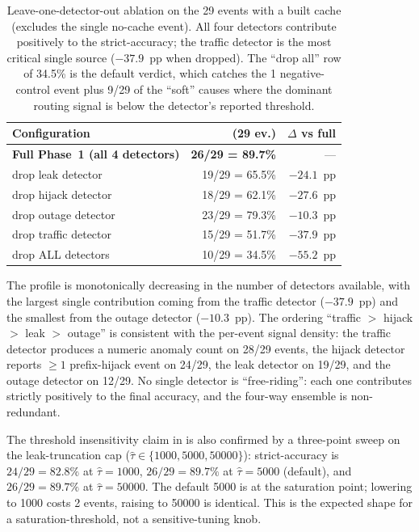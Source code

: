\begin{table}[h]
\centering
\small
\setlength{\tabcolsep}{4pt}
\begin{tabular}{p{}rr}
\hline
Configuration & \strict{} (29 ev.) & $\Delta$ vs full \\
\hline
\textbf{Full Phase~1 (all 4 detectors)} &
\textbf{26/29 = 89.7\%} & --- \\
\quad drop leak detector & 19/29 = 65.5\% & $-24.1$~pp \\
\quad drop hijack detector & 18/29 = 62.1\% & $-27.6$~pp \\
\quad drop outage detector & 23/29 = 79.3\% & $-10.3$~pp \\
\quad drop traffic detector & 15/29 = 51.7\% & $-37.9$~pp \\
\quad drop ALL detectors & 10/29 = 34.5\% & $-55.2$~pp \\
\hline
\end{tabular}

\caption{Leave-one-detector-out ablation on the 29
events with a built cache (excludes the single no-cache
event). All four detectors contribute positively to
the strict-accuracy; the traffic detector is the most
critical single source ($-37.9$~pp when dropped). The
\enquote{drop all} row of 34.5\% is the default
\protect verdict, which catches the 1
negative-control event plus 9/29 of the \enquote{soft}
causes where the dominant routing signal is below the
detector's reported threshold.}
\label{tab:detector-ablation}
\end{table}

The profile is monotonically decreasing in the number of
detectors available, with the largest single contribution
coming from the traffic detector ($-37.9$~pp) and the
smallest from the outage detector ($-10.3$~pp). The
ordering \enquote{traffic $>$ hijack $>$ leak $>$ outage}
is consistent with the per-event signal density:
the traffic detector produces a numeric anomaly count
on 28/29 events, the hijack detector reports
$\geq 1$ prefix-hijack event on 24/29, the leak detector
on 19/29, and the outage detector on 12/29. No single
detector is \enquote{free-riding}: each one contributes
strictly positively to the final accuracy, and the four-way
ensemble is non-redundant.

The threshold insensitivity claim in
 is also confirmed by a
three-point sweep on the leak-truncation cap
(\(\hat{\tau} \in \{1000, 5000, 50000\}\)):
strict-accuracy is \(24/29 = 82.8\%\) at \(\hat{\tau}{=}1000\),
\(26/29 = 89.7\%\) at \(\hat{\tau}{=}5000\) (default), and
\(26/29 = 89.7\%\) at \(\hat{\tau}{=}50000\). The default
5000 is at the saturation point; lowering to 1000 costs
2 events, raising to 50000 is identical. This is the
expected shape for a saturation-threshold, not a
sensitive-tuning knob.

